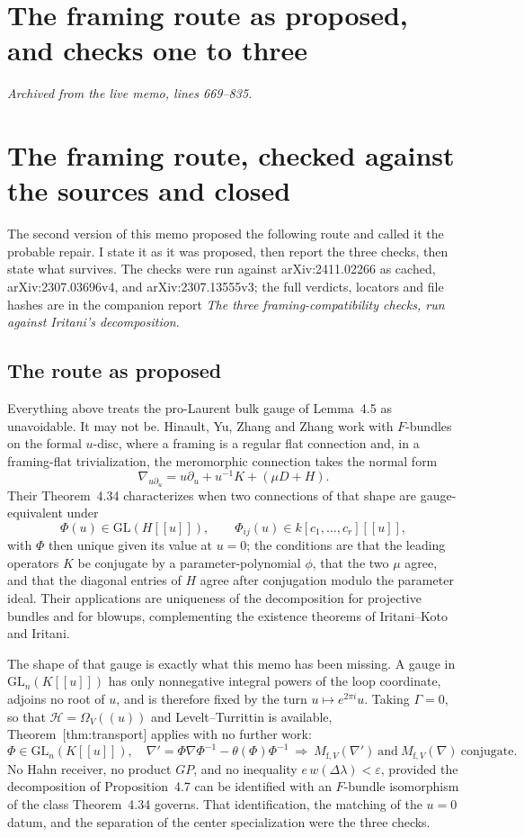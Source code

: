 \documentclass[11pt]{article}
\theoremstyle{definition}
\theoremstyle{remark}
\begin{document}
\section{The framing route as proposed, and checks one to three}
\noindent\emph{Archived from the live memo, lines 669--835.}

\section{The framing route, checked against the sources and closed}


The second version of this memo proposed the following route and called it the
probable repair. I state it as it was proposed, then report the three checks,
then state what survives. The checks were run against
arXiv:2411.02266 as cached, arXiv:2307.03696v4, and arXiv:2307.13555v3; the
full verdicts, locators and file hashes are in the companion report
\emph{The three framing-compatibility checks, run against Iritani's
decomposition}.

\subsection*{The route as proposed}

Everything above treats the pro-Laurent bulk gauge of Lemma~4.5 as unavoidable.
It may not be. Hinault, Yu, Zhang and Zhang work with $F$-bundles on the formal
$u$-disc, where a framing is a regular flat connection and, in a framing-flat
trivialization, the meromorphic connection takes the normal form
\[
  \nabla_{u\partial_u}=u\partial_u+u^{-1}K+(\mu D+H).
\]
Their Theorem~4.34 characterizes when two connections of that shape are
gauge-equivalent under
\[
  \Phi(u)\in\mathrm{GL}(H[[u]]),
  \qquad \Phi_{ij}(u)\in k[c_1,\dots,c_r][[u]],
\]
with $\Phi$ then unique given its value at $u=0$; the conditions are that the
leading operators $K$ be conjugate by a parameter-polynomial $\phi$, that the
two $\mu$ agree, and that the diagonal entries of $H$ agree after conjugation
modulo the parameter ideal. Their applications are uniqueness of the
decomposition for projective bundles and for blowups, complementing the
existence theorems of Iritani--Koto and Iritani.

The shape of that gauge is exactly what this memo has been missing. A gauge in
$\mathrm{GL}_n(K[[u]])$ has only nonnegative integral powers of the loop
coordinate, adjoins no root of $u$, and is therefore fixed by the turn
$u\mapsto e^{2\pi i}u$. Taking $\Gamma=0$, so that $\mathcal H=\Omega_V(\!(u)\!)$
and Levelt--Turrittin is available, Theorem~\textup{[thm:transport]} applies with no
further work:
\[
  \Phi\in\mathrm{GL}_n(K[[u]]),\quad
  \nabla'=\Phi\nabla\Phi^{-1}-\theta(\Phi)\Phi^{-1}
  \ \Longrightarrow\
  M_{\mathrm f,V}(\nabla')\ \text{and}\ M_{\mathrm f,V}(\nabla)\ \text{conjugate}.
\]
No Hahn receiver, no product $GP$, and no inequality
$e\,w(\Delta\lambda)<\varepsilon$, provided the decomposition of
Proposition~4.7 can be identified with an $F$-bundle isomorphism of the class
Theorem~4.34 governs. That identification, the matching of the $u=0$ datum, and
the separation of the center specialization were the three checks.
\end{document}
